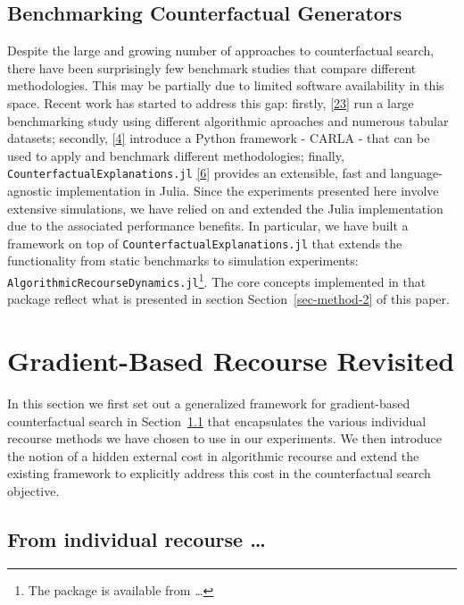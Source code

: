 \documentclass[
  conference]{IEEEtran}
\begin{document}
\hypertarget{sec-related-benchmark}{%
\subsection{Benchmarking Counterfactual
Generators}\label{sec-related-benchmark}}

Despite the large and growing number of approaches to counterfactual
search, there have been surprisingly few benchmark studies that compare
different methodologies. This may be partially due to limited software
availability in this space. Recent work has started to address this gap:
firstly, \protect\hyperlink{ref-de2021framework}{{[}23{]}} run a large
benchmarking study using different algorithmic aproaches and numerous
tabular datasets; secondly,
\protect\hyperlink{ref-pawelczyk2021carla}{{[}4{]}} introduce a Python
framework - CARLA - that can be used to apply and benchmark different
methodologies; finally, \texttt{CounterfactualExplanations.jl}
\protect\hyperlink{ref-altmeyer2022CounterfactualExplanations}{{[}6{]}}
provides an extensible, fast and language-agnostic implementation in
Julia. Since the experiments presented here involve extensive
simulations, we have relied on and extended the Julia implementation due
to the associated performance benefits. In particular, we have built a
framework on top of \texttt{CounterfactualExplanations.jl} that extends
the functionality from static benchmarks to simulation experiments:
\texttt{AlgorithmicRecourseDynamics.jl}\footnote{The package is
  available from \ldots{}}. The core concepts implemented in that
package reflect what is presented in section Section~\ref{sec-method-2}
of this paper.

\hypertarget{sec-method}{%
\section{Gradient-Based Recourse Revisited}\label{sec-method}}

In this section we first set out a generalized framework for
gradient-based counterfactual search in Section~\ref{sec-method-general}
that encapsulates the various individual recourse methods we have chosen
to use in our experiments. We then introduce the notion of a hidden
external cost in algorithmic recourse and extend the existing framework
to explicitly address this cost in the counterfactual search objective.

\hypertarget{sec-method-general}{%
\subsection{From individual recourse
\ldots{}}\label{sec-method-general}}
\end{document}
